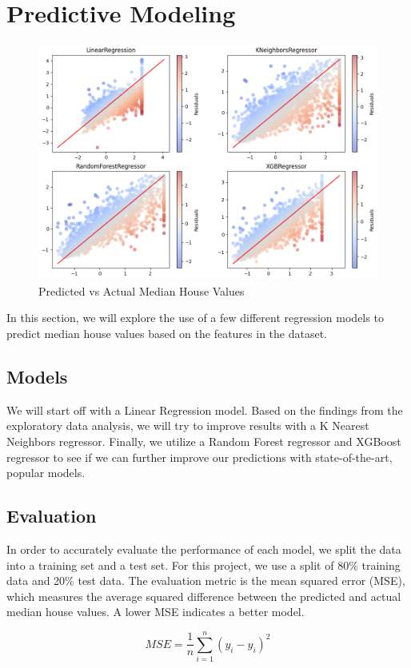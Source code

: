 \documentclass[letterpaper,twocolumn,10pt]{article}
\begin{document}
\section{Predictive Modeling}
\begin{figure}
    \centering
    \includegraphics[width=.8\textwidth]{images/results.png}
    \caption{Predicted vs Actual Median House Values}
    \label{fig:results}
\end{figure}

In this section, we will explore the use of a few different regression models to predict median house values based on the features in the dataset.

\subsection{Models}
We will start off with a Linear Regression model.
Based on the findings from the exploratory data analysis, we will try to improve results with a K Nearest Neighbors regressor. Finally, we utilize a Random Forest regressor and XGBoost regressor to see if we can further improve our predictions with state-of-the-art, popular models.

\subsection{Evaluation}
In order to accurately evaluate the performance of each model, we split the data into a training set and a test set.
For this project, we use a split of 80\% training data and 20\% test data.
The evaluation metric is the mean squared error (MSE), which measures the average squared difference between the predicted and actual median house values.
A lower MSE indicates a better model.

\begin{equation}
    MSE = \frac{1}{n} \sum_{i=1}^{n} (y_i - \hat{y}_i)^2
\end{equation}
\end{document}
